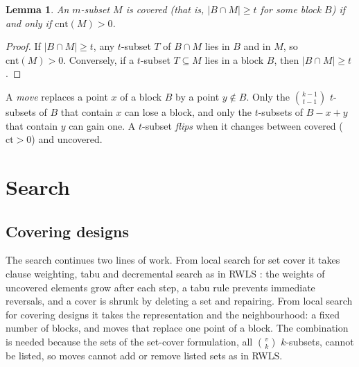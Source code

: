 \documentclass[11pt]{article}
\newtheorem{lemma}{Lemma}
\theoremstyle{remark}
\newcommand{\cov}{\mathrm{ct}}
\newcommand{\cnt}{\mathrm{cnt}}
\begin{document}
\begin{lemma}\label{lem:twolevel}
An $m$-subset $M$ is covered (that is, $|B\cap M|\ge t$ for some block $B$) if and only if $\cnt(M)>0$.
\end{lemma}
\begin{proof}
If $|B\cap M|\ge t$, any $t$-subset $T$ of $B\cap M$ lies in $B$ and in $M$, so $\cnt(M)>0$. Conversely, if a
$t$-subset $T\subseteq M$ lies in a block $B$, then $|B\cap M|\ge t$.
\end{proof}

A \emph{move} replaces a point $x$ of a block $B$ by a point $y\notin B$. Only the $\binom{k-1}{t-1}$ $t$-subsets of
$B$ that contain $x$ can lose a block, and only the $t$-subsets of $B-x+y$ that contain $y$ can gain one. A $t$-subset
\emph{flips} when it changes between covered ($\cov>0$) and uncovered.

\section{Search}\label{sec:search}

\subsection{Covering designs}\label{sec:plain}

The search continues two lines of work. From local search for set cover it takes clause weighting, tabu and
decremental search as in RWLS \cite{rwls2015}: the weights of uncovered elements grow after each step, a tabu rule
prevents immediate reversals, and a cover is shrunk by deleting a set and repairing. From local search for covering
designs \cite{nurmela1993,fadlaoui2011} it takes the representation and the neighbourhood: a fixed number of blocks,
and moves that replace one point of a block. The combination is needed because the sets of the set-cover formulation,
all $\binom{v}{k}$ $k$-subsets, cannot be listed, so moves cannot add or remove listed sets as in RWLS.
\end{document}

